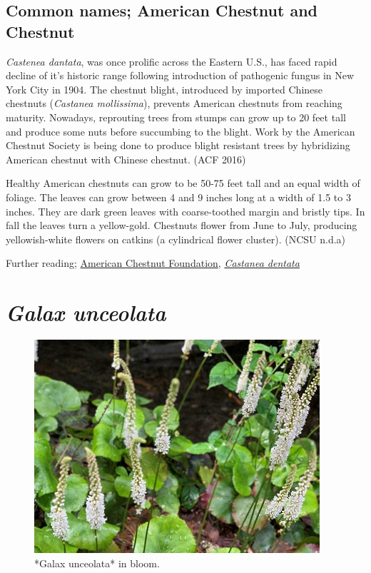 \documentclass[
]{article}
\begin{document}
\hypertarget{common-names-american-chestnut-and-chestnut}{%
\subsection{Common names; American Chestnut and Chestnut}\label{common-names-american-chestnut-and-chestnut}}

\emph{Castenea dantata}, was once prolific across the Eastern U.S., has faced rapid decline of it's historic range following introduction of pathogenic fungus in New York City in 1904. The chestnut blight, introduced by imported Chinese chestnuts (\emph{Castanea mollissima}), prevents American chestnuts from reaching maturity. Nowadays, reprouting trees from stumps can grow up to 20 feet tall and produce some nuts before succumbing to the blight. Work by the American Chestnut Society is being done to produce blight resistant trees by hybridizing American chestnut with Chinese chestnut. (ACF 2016)

Healthy American chestnuts can grow to be 50-75 feet tall and an equal width of foliage. The leaves can grow between 4 and 9 inches long at a width of 1.5 to 3 inches. They are dark green leaves with coarse-toothed margin and bristly tips. In fall the leaves turn a yellow-gold. Chestnuts flower from June to July, producing yellowish-white flowers on catkins (a cylindrical flower cluster). (NCSU n.d.a)

Further reading; \href{https://acf.org}{American Chestnut Foundation}, \href{https://plants.ces.ncsu.edu/plants/castanea-dentata/}{\emph{Castanea dentata}}

\hypertarget{galax-unceolata}{%
\section{\texorpdfstring{\emph{Galax unceolata}}{Galax unceolata}}\label{galax-unceolata}}

\begin{figure}

{\centering \includegraphics[width=0.5\linewidth]{galax1} 

}

\caption{*Galax unceolata* in bloom.}\label{fig:galax1}
\end{figure}
\end{document}
